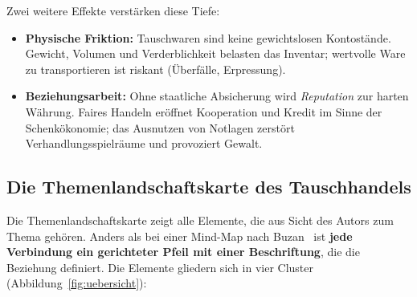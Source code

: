 \documentclass[11pt, a4paper]{article}
\begin{document}
Zwei weitere Effekte verstärken diese Tiefe:
\begin{itemize}
    \item \textbf{Physische Friktion:} Tauschwaren sind keine gewichtslosen
          Kontostände. Gewicht, Volumen und Verderblichkeit belasten das
          Inventar; wertvolle Ware zu transportieren ist riskant (Überfälle,
          Erpressung).
    \item \textbf{Beziehungsarbeit:} Ohne staatliche Absicherung wird
          \emph{Reputation} zur harten Währung. Faires Handeln eröffnet
          Kooperation und Kredit im Sinne der Schenkökonomie; das Ausnutzen von
          Notlagen zerstört Verhandlungsspielräume und provoziert Gewalt.
\end{itemize}

\subsection{Die Themenlandschaftskarte des Tauschhandels}
\label{sec:karte}

Die Themenlandschaftskarte zeigt alle Elemente, die aus Sicht des Autors zum
Thema gehören. Anders als bei einer Mind-Map nach Buzan~\cite{buzan1974} ist
\textbf{jede Verbindung ein gerichteter Pfeil mit einer Beschriftung}, die die
Beziehung definiert. Die Elemente gliedern sich in vier Cluster
(Abbildung~\ref{fig:uebersicht}):
\end{document}
